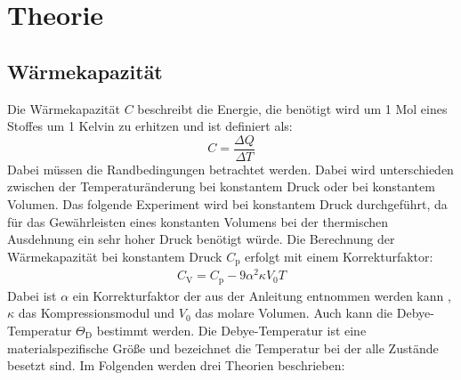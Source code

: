 
\section{Theorie}
\label{sec:Theorie}
\subsection{Wärmekapazität}
\label{sec:Wärmekapazität}
Die Wärmekapazität $C$ beschreibt die Energie, die benötigt wird um 1 Mol eines Stoffes um 1 Kelvin zu erhitzen und ist definiert als:
\begin{equation}
  \label{eqn:Wärmekapazität}
  C=\dfrac{\Delta Q}{\Delta T}
\end{equation}
Dabei müssen die Randbedingungen betrachtet werden. Dabei wird unterschieden zwischen der Temperaturänderung bei konstantem Druck oder bei konstantem Volumen. Das folgende Experiment wird bei konstantem Druck durchgeführt, da für das Gewährleisten eines konstanten Volumens bei der thermischen Ausdehnung ein sehr hoher Druck benötigt würde. Die Berechnung der Wärmekapazität bei konstantem Druck $C_\mathrm{p}$ erfolgt mit einem Korrekturfaktor:
\begin{align}
  \label{eqn:cv}
 C_\mathrm{V} = C_\mathrm{p}-9\alpha^2\kappa V_\mathrm{0}T
\end{align}
Dabei ist $\alpha$ ein Korrekturfaktor der aus der Anleitung entnommen werden kann \cite[3]{Anleitung}, $\kappa$ das Kompressionsmodul und $V_\mathrm{0}$ das molare Volumen.
Auch kann die Debye-Temperatur $\Theta_\mathrm{D}$ bestimmt werden. Die Debye-Temperatur ist eine materialspezifische Größe und bezeichnet die Temperatur bei der alle Zustände besetzt sind.
Im Folgenden werden drei Theorien beschrieben:
